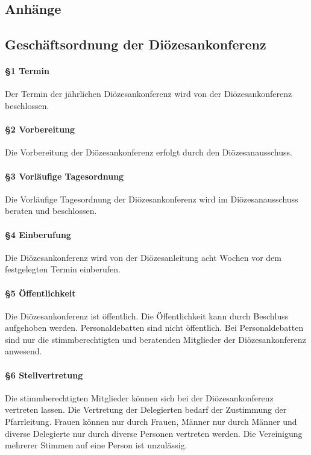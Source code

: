 \documentclass[12pt]{report}
\begin{document}
\begin{flushleft}
\part*{Anhänge}

\chapter*{Geschäftsordnung der Diözesankonferenz}

\subsection*{§1 Termin}
Der Termin der jährlichen Diözesankonferenz wird von der Diözesankonferenz beschlossen.
\subsection*{§2 Vorbereitung}
Die Vorbereitung der Diözesankonferenz erfolgt durch den Diözesanausschuss.
\subsection*{§3 Vorläufige Tagesordnung}
Die Vorläufige Tagesordnung der Diözesankonferenz wird im Diözesanausschuss beraten und beschlossen.
\subsection*{§4 Einberufung}
Die Diözesankonferenz wird von der Diözesanleitung acht Wochen vor dem festgelegten Termin einberufen.
\subsection*{§5 Öffentlichkeit}
Die Diözesankonferenz ist öffentlich. Die Öffentlichkeit kann durch Beschluss aufgehoben werden.
Personaldebatten sind nicht öffentlich. Bei Personaldebatten sind nur die stimmberechtigten und beratenden
Mitglieder der Diözesankonferenz anwesend.
\subsection*{§6 Stellvertretung}
Die stimmberechtigten Mitglieder können sich bei der Diözesankonferenz vertreten lassen. Die Vertretung
der Delegierten bedarf der Zustimmung der Pfarrleitung. Frauen können nur durch Frauen, Männer nur durch
Männer {\color{red} und diverse Delegierte nur durch diverse Personen} vertreten werden. Die Vereinigung mehrerer Stimmen auf eine Person ist unzulässig.

\end{flushleft}
\end{document}
